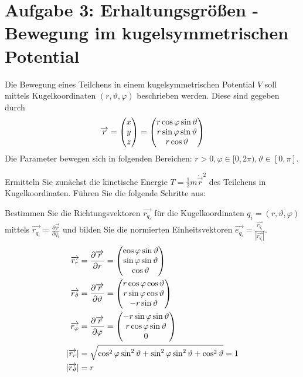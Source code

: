 \section*{Aufgabe 3: Erhaltungsgrößen - Bewegung im kugelsymmetrischen Potential}
Die Bewegung eines Teilchens in einem kugelsymmetrischen Potential $V$ soll mittels Kugelkoordinaten $(r,\vartheta,\varphi)$ beschrieben werden. Diese sind gegeben durch
\[\overrightarrow{r}=\begin{pmatrix}x\\y\\z\end{pmatrix}=\begin{pmatrix}r\cos\varphi\sin\vartheta\\r\sin\varphi\sin\vartheta\\r\cos\vartheta\end{pmatrix}\]
Die Parameter bewegen sich in folgenden Bereichen: $r>0,\varphi\in[0,2\pi),\vartheta\in[0,\pi]$.
\begin{enumeralph}
	\item Ermitteln Sie zunächst die kinetische Energie $T=\frac{1}{2}m\dot{\overrightarrow{r}}^2$ des Teilchens in Kugelkoordinaten. Führen Sie die folgende Schritte aus:
	\begin{enumeroman}
		\item Bestimmen Sie die Richtungsvektoren $\overrightarrow{r_{q_i}}$ für die Kugelkoordinaten $q_i=(r,\vartheta,\varphi)$ mittels $\overrightarrow{r_{q_i}}=\frac{\partial\overrightarrow{r}}{\partial q_i}$ und bilden Sie die normierten Einheitsvektoren $\overrightarrow{e_{q_i}}=\frac{\overrightarrow{r_{q_i}}}{|\overrightarrow{r_{q_i}}|}$.
		\begin{align*}
		\overrightarrow{r_r}&=\frac{\partial \overrightarrow{r}}{\partial r} = \vect{\cos\varphi\sin\vartheta\\\sin\varphi\sin\vartheta\\\cos\vartheta}\\
		\overrightarrow{r_\vartheta}&=\frac{\partial \overrightarrow{r}}{\partial \vartheta} = \vect{r\cos\varphi\cos\vartheta\\r\sin\varphi\cos\vartheta\\-r\sin\vartheta}\\
		\overrightarrow{r_\varphi}&=\frac{\partial \overrightarrow{r}}{\partial \varphi} = \vect{-r\sin\varphi\sin\vartheta\\r\cos\varphi\sin\vartheta\\0}\\
		|\overrightarrow{r_r}|&=\sqrt{\cos^2\varphi\sin^2\vartheta+\sin^2\varphi\sin^2\vartheta+\cos^2\vartheta} = 1\\
		|\overrightarrow{r_\vartheta}|&=r\\

\end{align*}
\end{enumeroman}
\end{enumeralph}
